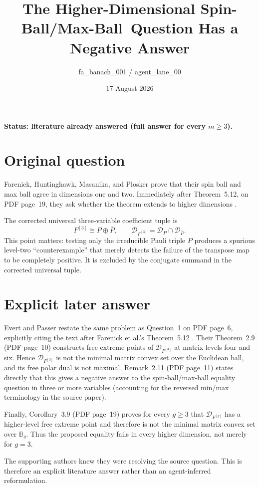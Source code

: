 \documentclass[10pt]{article}
\title{The Higher-Dimensional Spin-Ball/Max-Ball\
Question Has a Negative Answer}
\author{fa\_banach\_001 / agent\_lane\_00}
\date{17 August 2026}
\newcommand{\D}{\mathcal D}
\newcommand{\B}{\mathbb B}
\begin{document}
\maketitle

\noindent\textbf{Status: literature already answered (full answer for every
$m\geq 3$).}

\section*{Original question}

Farenick, Huntinghawk, Masanika, and Plosker prove that their spin ball and
max ball agree in dimensions one and two.  Immediately after
Theorem~5.12, on PDF page~19, they ask whether the theorem extends to higher
dimensions \cite{FHMP}.

The corrected universal three-variable coefficient tuple is
\[
 F^{[3]}\cong P\oplus\overline P,
 \qquad
 \D_{F^{[3]}}=\D_P\cap\D_{\overline P}.
\]
This point matters: testing only the irreducible Pauli triple $P$ produces a
spurious level-two ``counterexample'' that merely detects the failure of the
transpose map to be completely positive.  It is excluded by the conjugate
summand in the corrected universal tuple.

\section*{Explicit later answer}

Evert and Passer restate the same problem as Question~1 on PDF page~6,
explicitly citing the text after Farenick et al.'s Theorem~5.12
\cite{EP}.  Their Theorem~2.9 (PDF page~10) constructs free extreme points of
$\D_{F^{[3]}}$ at matrix levels four and six.  Hence
$\D_{F^{[3]}}$ is not the minimal matrix convex set over the Euclidean ball,
and its free polar dual is not maximal.  Remark~2.11 (PDF page~11) states
directly that this gives a negative answer to the spin-ball/max-ball
equality question in three or more variables (accounting for the reversed
min/max terminology in the source paper).

Finally, Corollary~3.9 (PDF page~19) proves for every $g\geq3$ that
$\D_{F^{[g]}}$ has a higher-level free extreme point and therefore is not the
minimal matrix convex set over $\B_g$.  Thus the proposed equality fails in
every higher dimension, not merely for $g=3$.

The supporting authors knew they were resolving the source question.  This
is therefore an explicit literature answer rather than an agent-inferred
reformulation.
\end{document}
